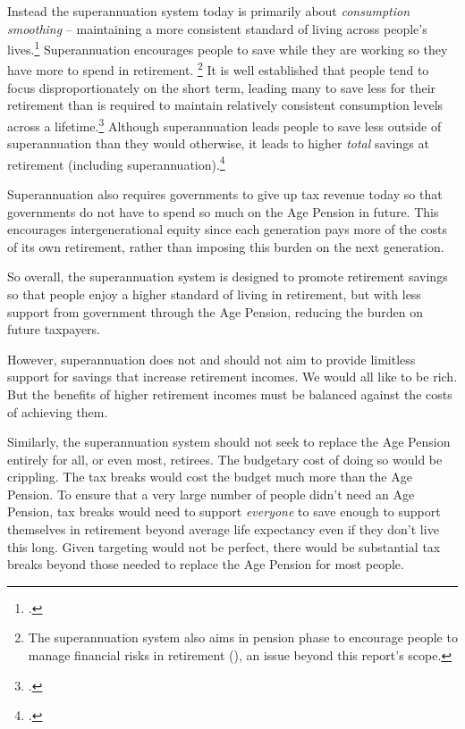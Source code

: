 \documentclass{grattanAlpha}
\begin{document}
Instead the superannuation system today is primarily about \emph{consumption smoothing} – maintaining a more consistent standard of living across people’s lives.\footcite[][288]{MirrleesAdamBesleyEtAl2011} Superannuation encourages people to save while they are working so they have more to spend in retirement.%
\footnote{The superannuation system also aims in pension phase to encourage people to manage financial risks in retirement (\textcite{MaddockKing2015}), an issue beyond this report’s scope.}
 It is well established that people tend to focus disproportionately on the short term, leading many to save less for their retirement than is required to maintain relatively consistent consumption levels across a lifetime.\footcite[][4]{FinancialSystemsInquiry2015} Although superannuation leads people to save less outside of superannuation than they would otherwise, it leads to higher \emph{total} savings at retirement (including superannuation).\footcites{GruenSoding2011}{Connolly2007}

 Superannuation also requires governments to give up tax revenue today so that governments do not have to spend so much on the Age Pension in future. This encourages intergenerational equity since each generation pays more of the costs of its own retirement, rather than imposing this burden on the next generation. 

 So overall, the superannuation system is designed to promote retirement savings so that people enjoy a higher standard of living in retirement, but with less support from government through the Age Pension, reducing the burden on future taxpayers. 

 However, superannuation does not and should not aim to provide limitless support for savings that increase retirement incomes. We would all like to be rich. But the benefits of higher retirement incomes must be balanced against the costs of achieving them. 

 Similarly, the superannuation system should not seek to replace the Age Pension entirely for all, or even most, retirees. The budgetary cost of doing so would be crippling. The tax breaks would cost the budget much more than the Age Pension. To ensure that a very large number of people didn’t need an Age Pension, tax breaks would need to support \emph{everyone} to save enough to support themselves in retirement beyond average life expectancy even if they don’t live this long. Given targeting would not be perfect, there would be substantial tax breaks beyond those needed to replace the Age Pension for most people. 
\end{document}
